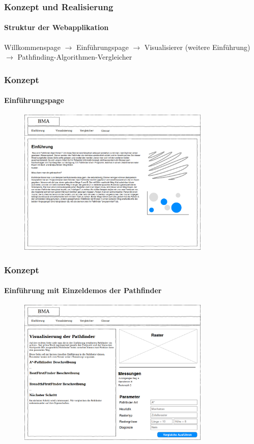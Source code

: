 \documentclass[professionalfont,serif,german]{beamer}
\begin{document}
\begin{frame}
  \frametitle{Konzept und Realisierung}
  \framesubtitle{Struktur der Webapplikation}
  Willkommenspage $\rightarrow$ Einführungspage $\rightarrow$ Visualisierer (weitere Einführung) $\rightarrow$ Pathfinding-Algorithmen-Vergleicher
\end{frame}

\begin{frame}
  \frametitle{Konzept}
  \framesubtitle{Einführungspage}
  \begin{figure}
    \includegraphics[height=7cm]{img/einfuehrung1.png}
  \end{figure}
\end{frame}

\begin{frame}
  \frametitle{Konzept}
  \framesubtitle{Einführung mit Einzeldemos der Pathfinder}
  \begin{figure}
    \includegraphics[height=7cm]{img/visualisierung1.png}
  \end{figure}
\end{frame}
\end{document}

